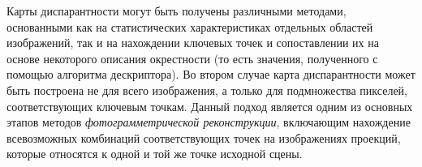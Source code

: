 \begin{SCn}
\end{SCn}

\begin{SCn}
\end{SCn}

Карты диспарантности могут быть получены различными методами, основанными как на статистических характеристиках отдельных областей изображений, так и на нахождении ключевых точек и сопоставлении их на основе некоторого описания окрестности (то есть значения, полученного с помощью алгоритма дескриптора). Во втором случае карта диспарантности может быть построена не для всего изображения, а только для подмножества пикселей, соответствующих ключевым точкам. Данный подход является одним из основных этапов методов \textit{фотограмметрической реконструкции}, включающим нахождение всевозможных комбинаций соответствующих точек на изображениях проекций, которые относятся к одной и той же точке исходной сцены.

